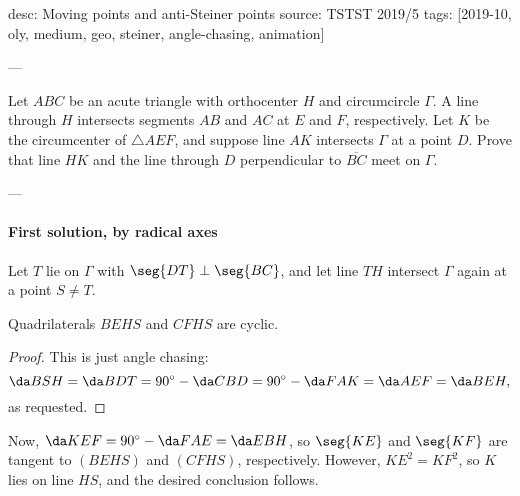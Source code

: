 desc: Moving points and anti-Steiner points
source: TSTST 2019/5
tags: [2019-10, oly, medium, geo, steiner, angle-chasing, animation]

---

Let $ABC$ be an acute triangle with orthocenter $H$ and circumcircle $\Gamma$. A line through $H$ intersects segments $AB$ and $AC$ at $E$ and $F$, respectively. Let $K$ be the circumcenter of $\triangle AEF$, and suppose line $AK$ intersects $\Gamma$ at a point $D$. Prove that line $HK$ and the line through $D$ perpendicular to $\overline{BC}$ meet on $\Gamma$.

---

\paragraph{First solution, by radical axes}     Let $T$ lie on $\Gamma$ with $\seg{DT}\perp\seg{BC}$, and let line $TH$ intersect $\Gamma$ again at a point $S\ne T$.
\begin{claim*}
    Quadrilaterals $BEHS$ and $CFHS$ are cyclic.
\end{claim*}
\begin{proof}
    This is just angle chasing: \[\da BSH=\da BDT=90^\circ-\da CBD=90^\circ-\da FAK=\da AEF=\da BEH,\]
    as requested.
\end{proof}

Now, $\da KEF=90^\circ-\da FAE=\da EBH$, so $\seg{KE}$ and $\seg{KF}$ are tangent to $(BEHS)$ and $(CFHS)$, respectively. However, $KE^2=KF^2$, so $K$ lies on line $HS$, and the desired conclusion follows. 

